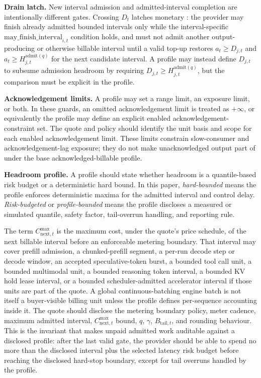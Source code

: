 \documentclass[11pt]{article}
\newcommand{\field}[1]{\texttt{\detokenize{#1}}}
\begin{document}
\textbf{Drain latch.} New interval admission and admitted-interval completion are intentionally different gates. Crossing \(D_t\) latches monetary \field{draining}: the provider may finish already admitted bounded intervals only while the interval-specific \(\mathrm{may\_finish\_interval}_{i,t}\) condition holds, and must not admit another output-producing or otherwise billable interval until a valid top-up restores \(a_t \geq D_{j,t}\) and \(a_t \geq H_{j,t}^{\mathrm{admit}(q)}\) for the next candidate interval. A profile may instead define \(D_{j,t}\) to subsume admission headroom by requiring \(D_{j,t}\geq H_{j,t}^{\mathrm{admit}(q)}\), but the comparison must be explicit in the profile.

\textbf{Acknowledgement limits.} A profile may set a range limit, an exposure limit, or both. In these guards, an omitted acknowledgement limit is treated as \(+\infty\), or equivalently the profile may define an explicit enabled acknowledgement-constraint set. The quote and policy should identify the unit basis and scope for each enabled acknowledgement limit. These limits constrain slow-consumer and acknowledgement-lag exposure; they do not make unacknowledged output part of \field{posted_cumulative_amount_due} under the base acknowledged-billable profile.

\textbf{Headroom profile.} A profile should state whether headroom is a quantile-based risk budget or a deterministic hard bound. In this paper, \emph{hard-bounded} means the profile enforces deterministic maxima for the admitted interval and control delay. \emph{Risk-budgeted} or \emph{profile-bounded} means the profile discloses a measured or simulated quantile, safety factor, tail-overrun handling, and reporting rule.

The term \(C_{\mathrm{next},t}^{\max}\) is the maximum cost, under the quote's price schedule, of the next billable interval before an enforceable metering boundary. That interval may cover prefill admission, a chunked-prefill segment, a per-run decode step or decode window, an accepted speculative-token burst, a bounded tool call unit, a bounded multimodal unit, a bounded reasoning token interval, a bounded KV hold lease interval, or a bounded scheduler-admitted accelerator interval if those units are part of the quote. A global continuous-batching engine batch is not itself a buyer-visible billing unit unless the profile defines per-sequence accounting inside it. The quote should disclose the metering boundary policy, meter cadence, maximum admitted interval, \(C_{\mathrm{next},t}^{\max}\) bound, \(q\), \(\gamma\), \(B_{\mathrm{tail},t}\), and rounding behaviour. This is the invariant that makes unpaid admitted work auditable against a disclosed profile: after the last valid gate, the provider should be able to spend no more than the disclosed interval plus the selected latency risk budget before reaching the disclosed hard-stop boundary, except for tail overruns handled by the profile.
\end{document}
